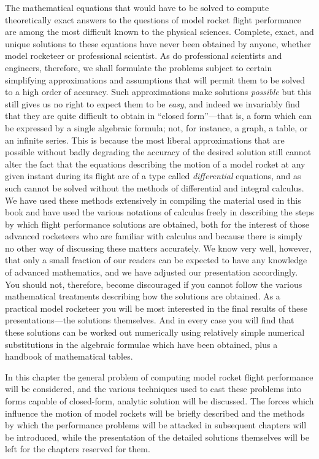 The mathematical equations that would have to be solved to compute theoretically exact answers to the questions of model rocket flight performance are among the most difficult known to the physical sciences. Complete, exact, and unique solutions to these equations have never been obtained by anyone, whether model rocketeer or professional scientist. As do professional scientists and engineers, therefore, we shall formulate the problems subject to certain simplifying approximations and assumptions that will permit them to be solved to a high order of accuracy. Such approximations make solutions \emph{possible} but this still gives us no right to expect them to be \emph{easy}, and indeed we invariably find that they are quite difficult to obtain in ``closed form''---that is, a form which can be expressed by a single algebraic formula; not, for instance, a graph, a table, or an infinite series. This is because the most liberal approximations that are possible without badly degrading the accuracy of the desired solution still cannot alter the fact that the equations describing the motion of a model rocket at any given instant during its flight are of a type called \emph{differential} equations, and as such cannot be solved without the methods of differential and integral calculus. We have used these methods extensively in compiling the material used in this book and have used the various notations of calculus freely in describing the steps by which flight performance solutions are obtained, both for the interest of those advanced rocketeers who are familiar with calculus and because there is simply no other way of discussing these matters accurately. We know very well, however, that only a small fraction of our readers can be expected to have any knowledge of advanced mathematics, and we have adjusted our presentation accordingly. You should not, therefore, become discouraged if you cannot follow the various mathematical treatments describing how the solutions are obtained. As a practical model rocketeer you will be most interested in the final results of these presentations---the solutions themselves. And in every case you will find that these solutions can be worked out numerically using relatively simple numerical substitutions in the algebraic formulae which have been obtained, plus a handbook of mathematical tables.

In this chapter the general problem of computing model rocket flight performance will be considered, and the various techniques used to cast these problems into forms capable of closed-form, analytic solution will be discussed. The forces which influence the motion of model rockets will be briefly described and the methods by which the performance problems will be attacked in subsequent chapters will be introduced, while the presentation of the detailed solutions themselves will be left for the chapters reserved for them.

